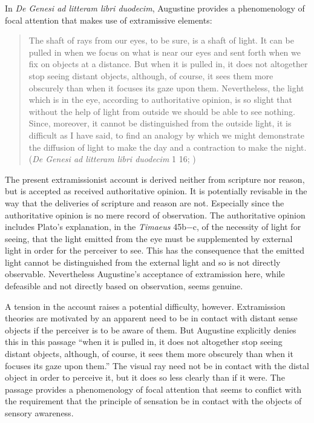 \documentclass[12pt]{article}
\begin{document}
In \emph{De Genesi ad litteram libri duodecim}, Augustine provides a phenomenology of focal attention that makes use of extramissive elements:
\begin{quote}
	The shaft of rays from our eyes, to be sure, is a shaft of light. It can be pulled in when we focus on what is near our eyes and sent forth when we fix on objects at a distance. But when it is pulled in, it does not altogether stop seeing distant objects, although, of course, it sees them more obscurely than when it focuses its gaze upon them. Nevertheless, the light which is in the eye, according to authoritative opinion, is so slight that without the help of light from outside we should be able to see nothing. Since, moreover, it cannot be distinguished from the outside light, it is difficult as I have said, to find an analogy by which we might demonstrate the diffusion of light to make the day and a contraction to make the night. (\emph{De Genesi ad litteram libri duodecim} 1 16; \citealt[37--38]{Taylor:1982aa})
\end{quote}
The present extramissionist account is derived neither from scripture nor reason, but is accepted as received authoritative opinion. It is potentially revisable in the way that the deliveries of scripture and reason are not. Especially since the authoritative opinion is no mere record of observation. The authoritative opinion includes Plato's explanation, in the \emph{Timaeus} 45b−c, of the necessity of light for seeing, that the light emitted from the eye must be supplemented by external light in order for the perceiver to see. This has the consequence that the emitted light cannot be distinguished from the external light and so is not directly observable. Nevertheless Augustine's acceptance of extramission here, while defeasible and not directly based on observation, seems genuine. 

A tension in the account raises a potential difficulty, however. Extramission theories are motivated by an apparent need to be in contact with distant sense objects if the perceiver is to be aware of them. But Augustine explicitly denies this in this passage ``when it is pulled in, it does not altogether stop seeing distant objects, although, of course, it sees them more obscurely than when it focuses its gaze upon them.'' The visual ray need not be in contact with the distal object in order to perceive it, but it does so less clearly than if it were. The passage provides a phenomenology of focal attention that seems to conflict with the requirement that the principle of sensation be in contact with the objects of sensory awareness.
\end{document}
